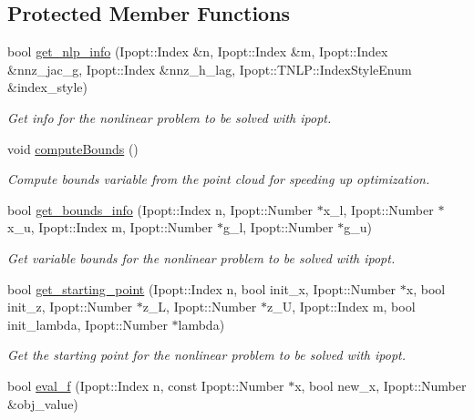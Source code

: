 \subsection*{Protected Member Functions}
\begin{DoxyCompactItemize}
\item 
bool \mbox{\hyperlink{classSuperQuadric__NLP_a2599f20c7a4c6eb3da7dec612098d1b4}{get\+\_\+nlp\+\_\+info}} (Ipopt\+::\+Index \&n, Ipopt\+::\+Index \&m, Ipopt\+::\+Index \&nnz\+\_\+jac\+\_\+g, Ipopt\+::\+Index \&nnz\+\_\+h\+\_\+lag, Ipopt\+::\+T\+N\+L\+P\+::\+Index\+Style\+Enum \&index\+\_\+style)
\begin{DoxyCompactList}\small\item\em Get info for the nonlinear problem to be solved with ipopt. \end{DoxyCompactList}\item 
\mbox{\label{classSuperQuadric__NLP_aaafe8516b6f3e68caf218f6cfb048c1b}} 
void \mbox{\hyperlink{classSuperQuadric__NLP_aaafe8516b6f3e68caf218f6cfb048c1b}{compute\+Bounds}} ()
\begin{DoxyCompactList}\small\item\em Compute bounds variable from the point cloud for speeding up optimization. \end{DoxyCompactList}\item 
bool \mbox{\hyperlink{classSuperQuadric__NLP_a9f303ff4d778230990fd151631c2d9d4}{get\+\_\+bounds\+\_\+info}} (Ipopt\+::\+Index n, Ipopt\+::\+Number $\ast$x\+\_\+l, Ipopt\+::\+Number $\ast$x\+\_\+u, Ipopt\+::\+Index m, Ipopt\+::\+Number $\ast$g\+\_\+l, Ipopt\+::\+Number $\ast$g\+\_\+u)
\begin{DoxyCompactList}\small\item\em Get variable bounds for the nonlinear problem to be solved with ipopt. \end{DoxyCompactList}\item 
bool \mbox{\hyperlink{classSuperQuadric__NLP_a05ec724269d1060c5e53112817938639}{get\+\_\+starting\+\_\+point}} (Ipopt\+::\+Index n, bool init\+\_\+x, Ipopt\+::\+Number $\ast$x, bool init\+\_\+z, Ipopt\+::\+Number $\ast$z\+\_\+L, Ipopt\+::\+Number $\ast$z\+\_\+U, Ipopt\+::\+Index m, bool init\+\_\+lambda, Ipopt\+::\+Number $\ast$lambda)
\begin{DoxyCompactList}\small\item\em Get the starting point for the nonlinear problem to be solved with ipopt. \end{DoxyCompactList}\item 
bool \mbox{\hyperlink{classSuperQuadric__NLP_ab33c41e6fa8674c1434aac9b18a62d37}{eval\+\_\+f}} (Ipopt\+::\+Index n, const Ipopt\+::\+Number $\ast$x, bool new\+\_\+x, Ipopt\+::\+Number \&obj\+\_\+value)

\end{DoxyCompactItemize}
